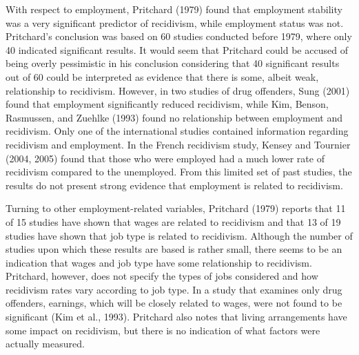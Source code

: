 With respect to employment, Pritchard (1979) found that employment stability was a very significant predictor of recidivism, while employment status was not.  Pritchard's conclusion was based on 60 studies conducted before 1979, where only 40 indicated significant results.  It would seem that Pritchard could be accused of being overly pessimistic in his conclusion considering that 40 significant results out of 60 could be interpreted as evidence that there is some, albeit weak, relationship to recidivism.  However, in two studies of drug offenders, Sung (2001) found that employment significantly reduced recidivism, while Kim, Benson, Rasmussen, and Zuehlke (1993) found no relationship between employment and recidivism.  Only one of the international studies contained information regarding recidivism and employment.  In the French recidivism study, Kensey and Tournier (2004, 2005) found that those who were employed had a much lower rate of recidivism compared to the unemployed.  From this limited set of past studies, the results do not present strong evidence that employment is related to recidivism.

Turning to other employment-related variables, Pritchard (1979) reports that 11 of 15 studies have shown that wages are related to recidivism and that 13 of 19 studies have shown that job type is related to recidivism.  Although the number of studies upon which these results are based is rather small, there seems to be an indication that wages and job type have some relationship to recidivism.  Pritchard, however, does not specify the types of jobs considered and how recidivism rates vary according to job type. In a study that examines only drug offenders, earnings, which will be closely related to wages, were not found to be significant (Kim et al., 1993).  Pritchard also notes that living arrangements have some impact on recidivism, but there is no indication of what factors were actually measured.

